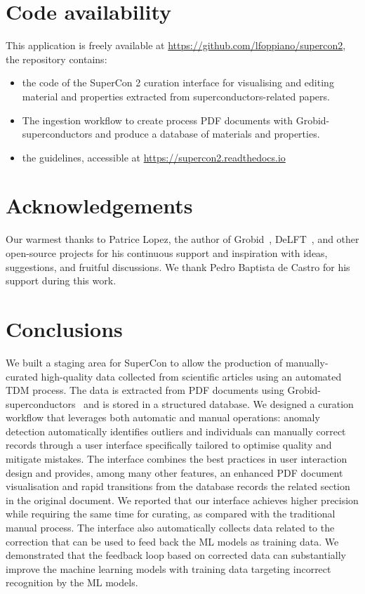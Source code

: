 \documentclass[a4paper]{article}
\begin{document}
\section{Code availability}
This application is freely available at \url{https://github.com/lfoppiano/supercon2}, the repository contains:
\begin{itemize}
\item the code of the SuperCon 2 curation interface for visualising and editing material and properties extracted from superconductors-related papers.
\item The ingestion workflow to create process PDF documents with Grobid-superconductors and produce a database of materials and properties.
\item the guidelines, accessible at \url{https://supercon2.readthedocs.io}
\end{itemize}

\section{Acknowledgements}
Our warmest thanks to Patrice Lopez, the author of Grobid~\cite{GROBID}, DeLFT~\cite{DeLFT}, and other open-source projects for his continuous support and inspiration with ideas, suggestions, and fruitful discussions.
We thank Pedro Baptista de Castro for his support during this work. 

\section{Conclusions}
We built a staging area for SuperCon to allow the production of manually-curated high-quality data collected from scientific articles using an automated TDM process. 
The data is extracted from PDF documents using Grobid-superconductors~\cite{lfoppiano2023automatic} and is stored in a structured database. 
We designed a curation workflow that leverages both automatic and manual operations: anomaly detection automatically identifies outliers and individuals can manually correct records through a user interface specifically tailored to optimise quality and mitigate mistakes.
The interface combines the best practices in user interaction design and provides, among many other features, an enhanced PDF document visualisation and rapid transitions from the database records the related section in the original document. 
We reported that our interface achieves higher precision while requiring the same time for curating, as compared with the traditional manual process.
The interface also automatically collects data related to the correction that can be used to feed back the ML models as training data. 
We demonstrated that the feedback loop based on corrected data can substantially improve the machine learning models with training data targeting incorrect recognition by the ML models. 
\end{document}
